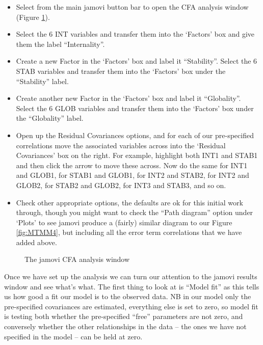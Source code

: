 \begin{itemize} \itemsep -2pt

\item Select  from the main jamovi button bar to open the CFA analysis window (Figure \ref{fig:MTMM5}).
\item Select the 6 INT variables and transfer them into the ‘Factors’ box and give them the label “Internality”.
\item Create a new Factor in the ‘Factors’ box and label it “Stability”. Select the 6 STAB variables and transfer them into the ‘Factors’ box under the “Stability” label. 
\item Create another new Factor in the ‘Factors’ box and label it “Globality”. Select the 6 GLOB variables and transfer them into the ‘Factors’ box under the “Globality” label.
\item Open up the Residual Covariances options, and for each of our pre-specified correlations move the associated variables across into the ‘Residual Covariances’ box on the right. For example, highlight both INT1 and STAB1 and then click the arrow to move these across. Now do the same for INT1 and GLOB1, for STAB1 and GLOB1, for INT2 and STAB2, for INT2 and GLOB2, for STAB2 and GLOB2, for INT3 and STAB3, and so on.
\item Check other appropriate options, the defaults are ok for this initial work through, though you might want to check the “Path diagram” option under ‘Plots’ to see jamovi produce a (fairly) similar diagram to our Figure \ref{fig:MTMM4}, but including all the error term correlations that we have added above.
\end{itemize} 

\begin{figure}[p]
\begin{center}
\caption{The jamovi CFA analysis window}
\label{fig:MTMM5}
\HR
\end{center}
\end{figure}

Once we have set up the analysis we can turn our attention to the jamovi results window and see what’s what. The first thing to look at is “Model fit” as this tells us how good a fit our model is to the observed data. NB in our model only the pre-specified covariances are estimated, everything else is set to zero, so model fit is testing both whether the pre-specified “free” parameters are not zero, and conversely whether the other relationships in the data – the ones we have not specified in the model – can be held at zero.

